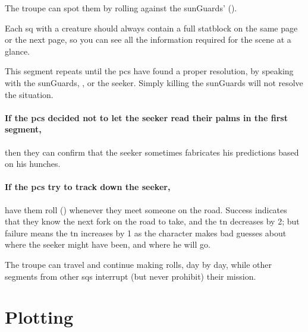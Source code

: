 \begin{multicols}{2}
The troupe can spot them by rolling  against the \glspl{sunGuard}'  (\tn).

Each \gls{sq} with a creature should always contain a full statblock on the same page or the next page, so you can see all the information required for the scene at a glance.

This \gls{segment} repeats until the \glspl{pc} have found a proper resolution, by speaking with the \glspl{sunGuard}, , or the \gls{seeker}.
Simply killing the \glspl{sunGuard} will not resolve the situation.


\paragraph{If the \glspl{pc} decided not to let the \gls{seeker} read their palms in the first \gls{segment},}
then they can confirm that the \gls{seeker} sometimes fabricates his predictions based on his hunches.

\paragraph{If the \glspl{pc} try to track down the \gls{seeker},}
have them roll  (\tn[12]) whenever they meet someone on the road.
Success indicates that they know the next fork on the road to take, and the \gls{tn} decreases by 2; but failure means the \gls{tn} increases by 1 as the character makes bad guesses about where the \gls{seeker} might have been, and where he will go.

The troupe can travel and continue making rolls, day by day, while other \glspl{segment} from other \glspl{sq} interrupt (but never prohibit) their mission.

\end{multicols}

\section{Plotting }

